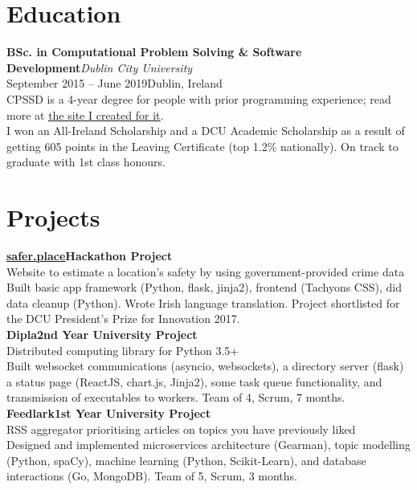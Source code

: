 \documentclass[a4paper, oneside, final]{scrartcl}
\newcommand{\nasc}[2]{\href{#1}{\color{blue}\setulcolor{blue}\ul{#2}}}
\newcommand{\bearna}[0]{\vspace{3mm}\\}
\newcommand{\fmtaddress}[1]{\textit{#1}}
\newcommand{\fmtjobtitle}[1]{\textbf{#1}}
\begin{document}
\section{Education}
\fmtjobtitle{BSc. in Computational Problem Solving \& Software Development}\hfill\fmtaddress{Dublin City University}\\
September 2015 -- June 2019\hfill Dublin, Ireland\\
CPSSD is a 4-year degree for people with prior programming experience; read more at \nasc{https://cpssd.net}{the site I created for it}.\\
I won an All-Ireland Scholarship and a DCU Academic Scholarship as a result of getting 605 points in the Leaving
Certificate (top 1.2\% nationally). On track to graduate with 1st class honours.
\section{Projects}
\fmtjobtitle{\nasc{http://safer.place}{safer.place}\hfill Hackathon Project}\\
Website to estimate a location’s safety by using government-provided crime data\\
Built basic app framework (Python, flask, jinja2), frontend (Tachyons CSS), did data cleanup (Python). Wrote Irish language
translation. Project shortlisted for the DCU President’s Prize for Innovation 2017.
\bearna
\fmtjobtitle{Dipla\hfill 2nd Year University Project}\\
Distributed computing library for Python 3.5+\\
Built websocket communications (asyncio, websockets), a directory server (flask) a status page (ReactJS, chart.js, Jinja2),
some task queue functionality, and transmission of executables to workers. Team of 4, Scrum, 7 months.
\bearna
\fmtjobtitle{Feedlark\hfill 1st Year University Project}\\
RSS aggregator prioritising articles on topics you have previously liked\\
Designed and implemented microservices architecture (Gearman), topic modelling (Python, spaCy), machine learning
(Python, Scikit-Learn), and database interactions (Go, MongoDB). Team of 5, Scrum, 3 months.
\end{document}
